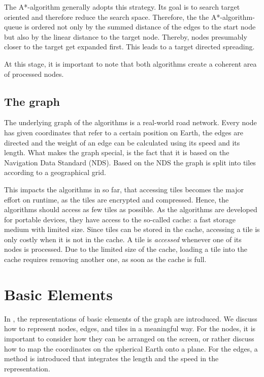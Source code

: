 \documentclass
[
    paper = a4,
    pagesize,
    12 pt,
    oneside,                       %
    open = right,
    DIV = calc,
    BCOR = 0 mm,                   %
    bibtotoc
]
{scrbook}
\begin{document}
The A*-algorithm generally adopts this strategy.
Its goal is to search target oriented and therefore reduce the search space.
Therefore, the the A*-algorithm-queue is ordered not only by the summed distance of the edges to the start node but also by the linear distance to the target node.
Thereby, nodes presumably closer to the target get expanded first.
This leads to a target directed spreading.

At this stage, it is important to note that both algorithms create a coherent area of processed nodes.

\subsection{The graph} \label{spec_graph}

The underlying graph of the algorithms is a real-world road network.
Every node has given coordinates that refer to a certain position on Earth, the edges are directed and the weight of an edge can be calculated using its speed and its length.
What makes the graph special, is the fact that it is based on the Navigation Data Standard (NDS).
Based on the NDS the graph is split into tiles according to a geographical grid.

This impacts the algorithms in so far, that accessing tiles becomes the major effort on runtime, as the tiles are encrypted and compressed.
Hence, the algorithms should access as few tiles as possible.
As the algorithms are developed for portable devices, they have access to the so-called cache: a fast storage medium with limited size.
Since tiles can be stored in the cache, accessing a tile is only costly when it is not in the cache.
A tile is \emph{accessed} whenever one of its nodes is processed.
Due to the limited size of the cache, loading a tile into the cache requires removing another one, as soon as the cache is full.


\section{Basic Elements}

In , the representations of basic elements of the graph are introduced.
We discuss how to represent nodes, edges, and tiles in a meaningful way.
For the nodes, it is important to consider how they can be arranged on the screen, or rather discuss how to map the coordinates on the spherical Earth onto a plane.
For the edges, a method is introduced that integrates the length and the speed in the representation.
\end{document}

